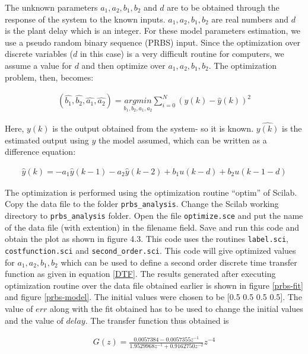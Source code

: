 The unknown parameters $a_1, a_2, b_1, b_2$ and $d$ are to be obtained through the response of the system to the known inputs.
$a_1, a_2, b_1, b_2$ are real numbers and $d$ is the plant delay which is an integer.  For these model parameters estimation, we
use a pseudo random binary sequence (PRBS) input. Since the optimization over discrete variables ($d$ in this case) is a very 
difficult routine for computers, we assume a value for $d$ and then optimize over  $a_1, a_2, b_1, b_2$. The optimization 
problem, then, becomes:


\begin{align}
(\hat{b_1}, \hat{b_2}, \hat{a_1}, \hat{a_2})=\underset{b_1, b_2, a_1, a_2}{argmin}\sum_{i=0}^{N}(y(k)-\hat{y}(k))^{2}
\end{align}


Here, $y(k)$ is the output obtained from the system- so it is known. $\hat{y(k)}$ is the estimated output using $y$ the model 
assumed, which can be written as a difference equation:

\begin{align}
\hat{y}(k) = -a_1\hat{y}(k - 1) - a_2\hat{y}(k - 2) + b_1 u(k - d) + b_2 u(k - 1 - d)
\end{align}

The optimization is performed using the optimization routine “optim” of Scilab. Copy the  data file to the folder 
{\tt prbs\_analysis}. Change the Scilab working directory to {\tt prbs\_analysis} folder. Open the file {\tt optimize.sce} 
and put the name of the data file (with extention) in the filename field. Save and run this code and obtain the plot as 
shown in figure 4.3. This code uses the routines {\tt label.sci}, {\tt costfunction.sci} and {\tt second\_order.sci}. This 
code will give optimized values for $a_1, a_2, b_1, b_2$ which can be used to define a second order discrete time transfer 
function as given in equation \ref{DTF}. The results generated after executing optimization routine over the data file 
obtained earlier is shown in figure \ref{prbs-fit} and figure \ref{prbs-model}. The initial values were chosen to be 
[0.5 0.5 0.5 0.5]. The value of $err$ along with the fit obtained has to be used to change the initial values and the value 
of $delay$. The transfer function thus obtained is 

\begin{align}\label{model}
G(z)=\frac{0.0057384 - 0.0057355 z^{-1}}{1.9529968z^{-1}+0.9162750z^{-2}}z^{-4}
\end{align}



